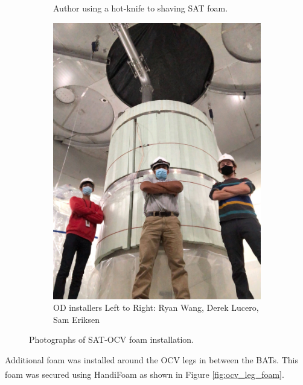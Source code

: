 \begin{figure}[!htbp]
\begin{subfigure}{.5\textwidth}
  \caption{Author using a hot-knife to shaving SAT foam.}
  \label{fig:foam_saving}
  \end{subfigure}
  \begin{subfigure}{.5\textwidth}
  \centering
  \includegraphics[width=\linewidth]{Figures/Construction/SAT_foam_fittest.jpg}
  \caption{OD installers Left to Right: Ryan Wang, Derek Lucero, Sam Eriksen}
  \label{fig:SAT_foam_guys}
  \end{subfigure}
\caption{Photographs of SAT-OCV foam installation.}
\label{fig:SAT_foam_installation}
\end{figure}

\par
Additional foam was installed around the OCV legs in between the BATs.
This foam was secured using HandiFoam\textsuperscript{\textregistered} as shown in Figure \ref{fig:ocv_leg_foam}.

